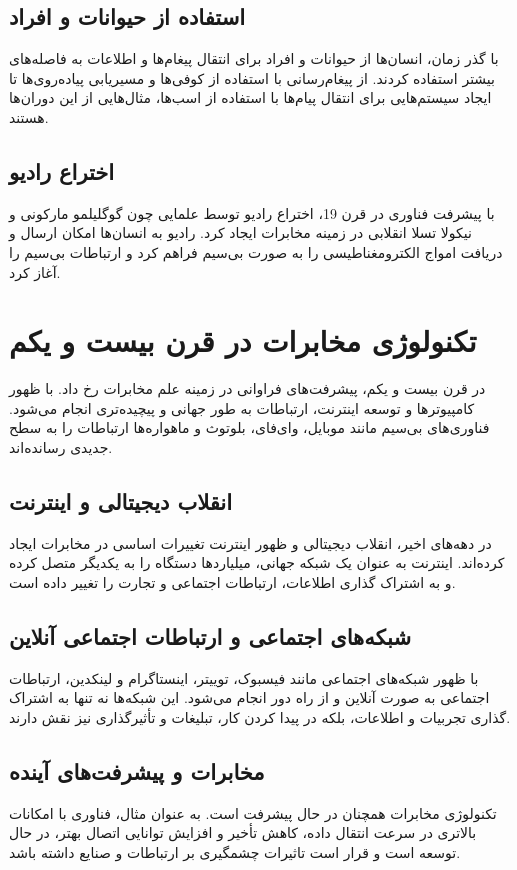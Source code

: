 \subsection{استفاده از حیوانات و افراد}
با گذر زمان، انسان‌ها از حیوانات و افراد برای انتقال پیغام‌ها و اطلاعات به فاصله‌های بیشتر استفاده کردند. از پیغام‌رسانی با استفاده از کوفی‌ها و مسیریابی پیاده‌روی‌ها تا ایجاد سیستم‌هایی برای انتقال پیام‌ها با استفاده از اسب‌ها، مثال‌هایی از این دوران‌ها هستند.

\subsection{اختراع رادیو}
با پیشرفت فناوری در قرن 19، اختراع رادیو توسط علمایی چون گوگلیلمو مارکونی و نیکولا تسلا انقلابی در زمینه مخابرات ایجاد کرد. رادیو به انسان‌ها امکان ارسال و دریافت امواج الکترومغناطیسی را به صورت بی‌سیم فراهم کرد و ارتباطات بی‌سیم را آغاز کرد.
\section{تکنولوژی مخابرات در قرن بیست و یکم}
در قرن بیست و یکم، پیشرفت‌های فراوانی در زمینه علم مخابرات رخ داد. با ظهور کامپیوترها و توسعه اینترنت، ارتباطات به طور جهانی و پیچیده‌تری انجام می‌شود. فناوری‌های بی‌سیم مانند موبایل، وای‌فای، بلوتوث و ماهواره‌ها ارتباطات را به سطح جدیدی رسانده‌اند.

\subsection{انقلاب دیجیتالی و اینترنت}
در دهه‌های اخیر، انقلاب دیجیتالی و ظهور اینترنت تغییرات اساسی در مخابرات ایجاد کرده‌اند. اینترنت به عنوان یک شبکه جهانی، میلیاردها دستگاه را به یکدیگر متصل کرده و به اشتراک گذاری اطلاعات، ارتباطات اجتماعی و تجارت را تغییر داده است.

\subsection{شبکه‌های اجتماعی و ارتباطات اجتماعی آنلاین}
با ظهور شبکه‌های اجتماعی مانند فیسبوک، توییتر، اینستاگرام و لینکدین، ارتباطات اجتماعی به صورت آنلاین و از راه دور انجام می‌شود. این شبکه‌ها نه تنها به اشتراک گذاری تجربیات و اطلاعات، بلکه در پیدا کردن کار، تبلیغات و تأثیرگذاری نیز نقش دارند.

\subsection{مخابرات  و پیشرفت‌های آینده}
تکنولوژی مخابرات همچنان در حال پیشرفت است. به عنوان مثال، فناوری  با امکانات بالاتری در سرعت انتقال داده، کاهش تأخیر و افزایش توانایی اتصال بهتر، در حال توسعه است و قرار است تاثیرات چشمگیری بر ارتباطات و صنایع داشته باشد.
